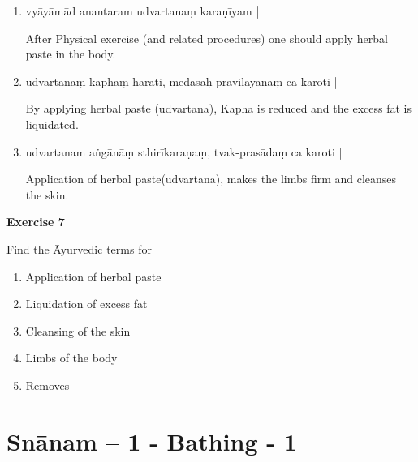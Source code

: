 \begin{enumerate}
\item {}

vyāyāmād anantaram udvartanaṃ karaṇīyam |

After Physical exercise (and related procedures) one should apply herbal paste in the body.  

\item {}

udvartanaṃ kaphaṃ harati, medasaḥ pravilāyanaṃ ca karoti |

By applying herbal paste (udvartana), Kapha is reduced and the excess fat is liquidated. 

\item {}

udvartanam aṅgānāṃ sthirīkaraṇaṃ, tvak-prasādaṃ ca karoti | 

Application of herbal paste(udvartana), makes the limbs firm and cleanses the skin.
\end{enumerate}

\begin{center}
\textbf{\large Exercise  7}
\end{center}

Find the Āyurvedic terms for 

\begin{enumerate}
\renewcommand{\theenumi}{\alph{enumi}}
\renewcommand{\labelenumi}{\theenumi.}
\item Application of herbal paste
\item Liquidation of excess fat
\item Cleansing of the skin
\item Limbs of the body
\item Removes
\end{enumerate}

\chapter{Snānam – 1 - Bathing - 1}

